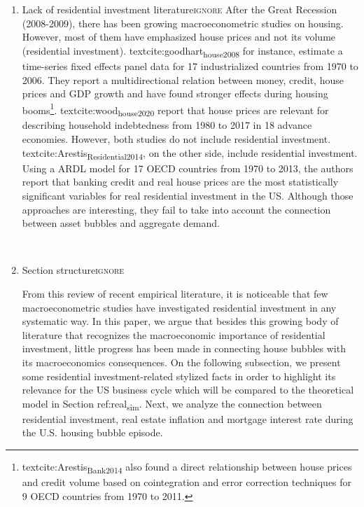 \documentclass[12pt]{article}
\begin{document}
\begin{enumerate}
\\



\item Lack of residential investment literature\hfill{}\textsc{ignore}
\label{sec:org4f60e33}
After the Great Recession (2008-2009), there has been growing macroeconometric studies on housing.
However, most of them have emphasized house prices and not its volume (residential investment).
textcite:goodhart\textsubscript{house}\textsubscript{2008} for instance, estimate a time-series fixed effects panel data for 17 industrialized countries from 1970 to 2006. They report a multidirectional relation between money, credit, house prices and GDP growth and have found stronger effects during housing booms\footnote{textcite:Arestis\textsubscript{Bank}\textsubscript{2014} also found a  direct relationship between house prices and credit volume based on cointegration and error correction techniques for 9 OECD countries from 1970 to 2011.}. 
textcite:wood\textsubscript{house}\textsubscript{2020} report that house prices are relevant for describing household indebtedness from 1980 to 2017 in 18 advance economies.
However, both studies do not include residential investment.
textcite:Arestis\textsubscript{Residential}\textsubscript{2014}, on the other side, include residential investment. Using a ARDL model for 17 OECD countries from 1970 to 2013, the authors report that banking credit and real house prices are the most statistically significant variables for real residential investment in the US.
Although those approaches are interesting, they fail to take into account the connection between asset bubbles and aggregate demand.

\\

\item Section structure\hfill{}\textsc{ignore}
\label{sec:orge40c43e}

From this review of recent empirical literature, it is noticeable that few macroeconometric studies have investigated residential investment in any systematic way.
In this paper, we argue that besides this growing body of literature that recognizes the macroeconomic importance of residential investment, little progress has been made in connecting house bubbles with its macroeconomics consequences.
On the following subsection, we present some residential investment-related stylized facts in order to highlight its relevance for the US business cycle which will be compared to the theoretical model in Section ref:real\textsubscript{sim}.
Next, we analyze the connection between residential investment, real estate inflation and mortgage interest rate during the U.S. housing bubble episode.
\end{enumerate}
\end{document}

